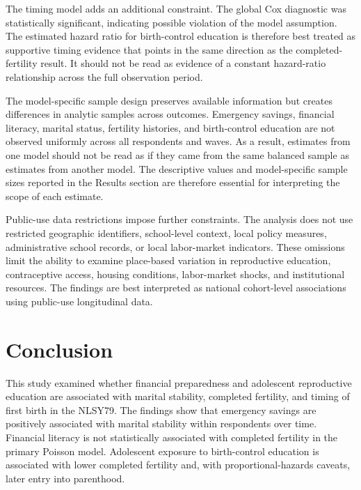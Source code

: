 \documentclass[12pt]{article}
\begin{document}
The timing model adds an additional constraint. The global Cox diagnostic was statistically significant, indicating possible violation of the model assumption. The estimated hazard ratio for birth-control education is therefore best treated as supportive timing evidence that points in the same direction as the completed-fertility result. It should not be read as evidence of a constant hazard-ratio relationship across the full observation period.

The model-specific sample design preserves available information but creates differences in analytic samples across outcomes. Emergency savings, financial literacy, marital status, fertility histories, and birth-control education are not observed uniformly across all respondents and waves. As a result, estimates from one model should not be read as if they came from the same balanced sample as estimates from another model. The descriptive values and model-specific sample sizes reported in the Results section are therefore essential for interpreting the scope of each estimate.

Public-use data restrictions impose further constraints. The analysis does not use restricted geographic identifiers, school-level context, local policy measures, administrative school records, or local labor-market indicators. These omissions limit the ability to examine place-based variation in reproductive education, contraceptive access, housing conditions, labor-market shocks, and institutional resources. The findings are best interpreted as national cohort-level associations using public-use longitudinal data.


\section{Conclusion}

This study examined whether financial preparedness and adolescent reproductive education are associated with marital stability, completed fertility, and timing of first birth in the NLSY79. The findings show that emergency savings are positively associated with marital stability within respondents over time. Financial literacy is not statistically associated with completed fertility in the primary Poisson model. Adolescent exposure to birth-control education is associated with lower completed fertility and, with proportional-hazards caveats, later entry into parenthood.
\end{document}
